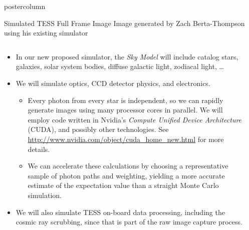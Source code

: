 \documentclass[final,hyperref={pdfpagelabels=false}]{beamer}
\newlength{\columnheight}
\begin{document}
\begin{frame}
\begin{columns}
    \begin{column}{.49\textwidth}
      \begin{beamercolorbox}[center,wd=\textwidth]{postercolumn}
        \begin{minipage}[T]{.95\textwidth}
          \parbox[t][\columnheight]{\textwidth}{
            \begin{block}{Simulated TESS Full Frame Image}
            Image generated by Zach Berta-Thompson using his existing simulator
              \begin{columns}
                \begin{column}{.70\textwidth}
                \begin{itemize}
                    \item In our new proposed simulator, the \emph{Sky Model} will include catalog stars, galaxies, solar system bodies, diffuse galactic light, zodiacal light, \ldots
                    \vfill
                    \item We will simulate optics, CCD detector physics, and electronics.
                    \begin{itemize}
                    	\item Every photon from every star is independent, so we can rapidly generate images using many processor cores in parallel. We will employ code written in Nvidia's \emph{Compute Unified Device Architecture} (CUDA), and possibly other technologies. See \url{http://www.nvidia.com/object/cuda_home_new.html} for more details.
			\item We can accelerate these calculations by choosing a representative sample of photon paths and weighting, yielding a more accurate estimate of the expectation value than a straight Monte Carlo simulation.
                    \end{itemize}
                    \vfill
                    \item We will also simulate TESS on-board data processing, including the cosmic ray scrubbing, since that is part of the raw image capture process.
                    \vfill
                \end{itemize}
                \end{column}
                \begin{column}{.28\textwidth}

\end{column}
\end{columns}
\end{block}}
\end{minipage}
\end{beamercolorbox}
\end{column}
\end{columns}
\end{frame}
\end{document}
